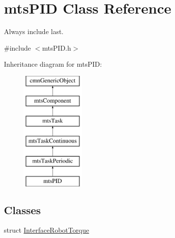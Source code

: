 \hypertarget{classmts_p_i_d}{\section{mts\-P\-I\-D Class Reference}
\label{classmts_p_i_d}
}


Always include last.  




{\ttfamily \#include $<$mts\-P\-I\-D.\-h$>$}

Inheritance diagram for mts\-P\-I\-D\-:\begin{figure}[H]
\begin{center}
\leavevmode
\includegraphics[height=6.000000cm]{de/d85/classmts_p_i_d}
\end{center}
\end{figure}
\subsection*{Classes}
\begin{DoxyCompactItemize}
\item 
struct \hyperlink{structmts_p_i_d_1_1_interface_robot_torque}{Interface\-Robot\-Torque}
\end{DoxyCompactItemize}
